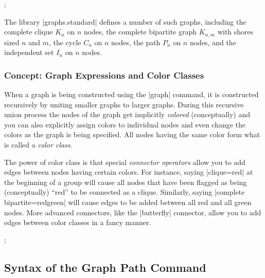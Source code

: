\begin{codeexample}[]
\tikz {};
\end{codeexample}

The library |graphs.standard| defines a number of such graphs,
including the complete clique $K_n$ on $n$ nodes, the complete
bipartite graph $K_{n,m}$ with shores sized $n$ and $m$, the cycle
$C_n$ on $n$ nodes, the path $P_n$ on $n$ nodes, and the independent
set $I_n$ on $n$ nodes.


\subsubsection{Concept: Graph Expressions and Color Classes}

When a graph is being constructed using the |graph| command, it is
constructed recursively by uniting smaller graphs to larger
graphs. During this recursive union process the nodes
of the graph get implicitly \emph{colored} (conceptually) and you can
also explicitly assign colors to individual nodes and even change the
colors as the graph is being specified. All nodes having the same
color form what is called a \emph{color class}.

The power of color class is that special \emph{connector operators}
allow you to add edges between nodes having certain colors. For instance,
saying |clique=red| at the beginning of a group will
cause all nodes that have been flagged as being (conceptually) ``red''
to be connected as a clique. Similarly, saying
|complete bipartite={red}{green}| will cause edges to be added
between all red and all green nodes. More advanced connectors, like
the |butterfly| connector, allow you to add edges between color
classes in a fancy manner.

\begin{codeexample}[]
\tikz [x=8mm, y=6mm, font=\footnotesize, circle]
  ;
\end{codeexample}



\subsection{Syntax of the Graph Path Command}

